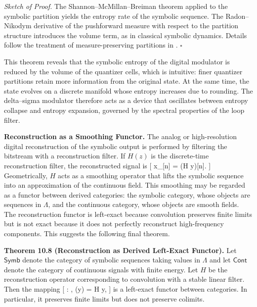 \textit{Sketch of Proof.}
The Shannon–McMillan–Breiman theorem applied to the symbolic partition yields the entropy rate of the symbolic sequence. The Radon–Nikodym derivative of the pushforward measure with respect to the partition structure introduces the volume term, as in classical symbolic dynamics. Details follow the treatment of measure-preserving partitions in \cite{strogatz1994nonlineardynamics}. \hfill $\square$

\medskip

This theorem reveals that the symbolic entropy of the digital modulator is reduced by the volume of the quantizer cells, which is intuitive: finer quantizer partitions retain more information from the original state. At the same time, the state evolves on a discrete manifold whose entropy increases due to rounding. The delta–sigma modulator therefore acts as a device that oscillates between entropy collapse and entropy expansion, governed by the spectral properties of the loop filter.

\medskip

\textbf{Reconstruction as a Smoothing Functor.}
The analog or high-resolution digital reconstruction of the symbolic output is performed by filtering the bitstream with a reconstruction filter. If $H(z)$ is the discrete-time reconstruction filter, the reconstructed signal is
[
x_{}[n] = (H \ast y)[n].
]
Geometrically, $H$ acts as a smoothing operator that lifts the symbolic sequence into an approximation of the continuous field. This smoothing may be regarded as a functor between derived categories: the symbolic category, whose objects are sequences in $\Lambda$, and the continuous category, whose objects are smooth fields. The reconstruction functor is left-exact because convolution preserves finite limits but is not exact because it does not perfectly reconstruct high-frequency components. This suggests the following final theorem.

\medskip

\textbf{Theorem 10.8 (Reconstruction as Derived Left-Exact Functor).}
Let $\mathsf{Symb}$ denote the category of symbolic sequences taking values in $\Lambda$ and let $\mathsf{Cont}$ denote the category of continuous signals with finite energy. Let $H$ be the reconstruction operator corresponding to convolution with a stable linear filter. Then the mapping
[
 :  \to {},
\qquad
{}(y) = H \ast y,
]
is a left-exact functor between categories. In particular, it preserves finite limits but does not preserve colimits.

